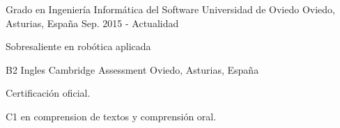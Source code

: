 

\begin{cventries}

  \cventry
  {Grado en Ingeniería Informática del Software} %
  {Universidad de Oviedo} %
  {Oviedo, Asturias, España} %
  {Sep. 2015 - Actualidad} %
  {
    \begin{cvitems} %
      \item {Sobresaliente en robótica aplicada}
    \end{cvitems}
  }


  \cventry
  {B2 Ingles} %
  {Cambridge Assessment} %
  {Oviedo, Asturias, España} %
  {} %
  {
    \begin{cvitems} %
      \item {Certificación oficial.}
      \item {C1 en comprension de textos y comprensión oral.}
    \end{cvitems}
  }

\end{cventries}
